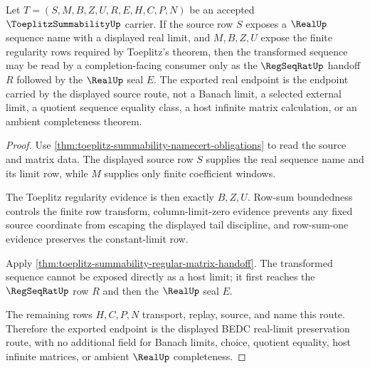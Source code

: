 \begin{theorem}\label{thm:toeplitz-summability-real-limit-preservation}
Let $T=(S,M,B,Z,U,R,E,H,C,P,N)$ be an accepted $\ToeplitzSummabilityUp$ carrier. If the source row $S$ exposes a $\RealUp$ sequence name with a displayed real limit, and $M,B,Z,U$ expose the finite regularity rows required by Toeplitz's theorem, then the transformed sequence may be read by a completion-facing consumer only as the $\RegSeqRatUp$ handoff $R$ followed by the $\RealUp$ seal $E$. The exported real endpoint is the endpoint carried by the displayed source route, not a Banach limit, a selected external limit, a quotient sequence equality class, a host infinite matrix calculation, or an ambient completeness theorem.
\end{theorem}
\begin{proof}
Use \autoref{thm:toeplitz-summability-namecert-obligations} to read the source and matrix data. The displayed source row $S$ supplies the real sequence name and its limit row, while $M$ supplies only finite coefficient windows.

The Toeplitz regularity evidence is then exactly $B,Z,U$. Row-sum boundedness controls the finite row transform, column-limit-zero evidence prevents any fixed source coordinate from escaping the displayed tail discipline, and row-sum-one evidence preserves the constant-limit row.

Apply \autoref{thm:toeplitz-summability-regular-matrix-handoff}. The transformed sequence cannot be exposed directly as a host limit; it first reaches the $\RegSeqRatUp$ row $R$ and then the $\RealUp$ seal $E$.

The remaining rows $H,C,P,N$ transport, replay, source, and name this route. Therefore the exported endpoint is the displayed BEDC real-limit preservation route, with no additional field for Banach limits, choice, quotient equality, host infinite matrices, or ambient $\RealUp$ completeness.
\end{proof}



